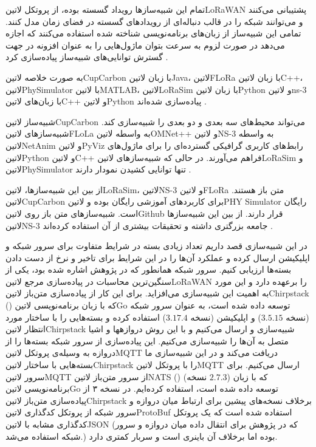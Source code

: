 تمام این شبیه‌سازها رویداد گسسته بوده، از پروتکل ‌لاتین{LoRaWAN} پشتیبانی می‌کنند و می‌توانند شبکه را در قالب
دنباله‌ای از رویدادهای گسسته در فضای زمان مدل کنند.
تمامی این شبیه‌ساز از زبان‌های برنامه‌نویسی شناخته شده استفاده می‌کنند که اجازه می‌دهد در صورت لزوم به سرعت بتوان
ماژول‌هایی را به عنوان افزونه در جهت گسترش توانایی‌های شبیه‌ساز پیاده‌سازی کرد
.

به صورت خلاصه ‌لاتین{CupCarbon} با زبان ‌لاتین{Java}، ‌لاتین{FLoRa} با زبان ‌لاتین{C++}،
‌لاتین{PhySimulator} با ‌لاتین{MATLAB}، ‌لاتین{LoRaSim} با زبان ‌لاتین{Python}
و ‌لاتین{ns-3} با زبان‌های ‌لاتین{C++} و ‌لاتین{Python} پیاده‌سازی شده‌اند
.

شبیه‌ساز ‌لاتین{CupCarbon} می‌تواند محیط‌های سه بعدی و دو بعدی را شبیه‌سازی کند.
شبیه‌سازهای ‌لاتین{FLoLa} به واسطه ‌لاتین{OMNet++} و ‌لاتین{NS-3} به واسطه
‌لاتین{NetAnim} و ‌لاتین{PyViz} رابط‌های کاربری گرافیکی گسترده‌ای را برای ماژول‌های ‌لاتین{Python}
و ‌لاتین{C++} فراهم می‌آورند.
در حالی که شبیه‌سازهای ‌لاتین{LoRaSim} و ‌لاتین{PhySimulator} تنها توانایی کشیدن نمودار دارند
.

از بین این شبیه‌سازها، ‌لاتین{LoRaSim}، ‌لاتین{NS-3} و ‌لاتین{FLoRa} متن باز هستند.
‌لاتین{CupCarbon} برای کاربردهای آموزشی رایگان بوده و ‌لاتین{PHY Simulator} رایگان است.
شبیه‌سازهای متن‌ باز روی ‌لاتین{Github} قرار دارند. از بین این شبیه‌سازها ‌لاتین{NS-3}
جامعه بزرگتری داشته و تحقیقات بیشتری از آن استفاده کرده‌اند
.


در این شبیه‌سازی قصد داریم تعداد زیادی بسته در شرایط متفاوت برای سرور شبکه و اپلیکیشن ارسال کرده و عملکرد آن‌ها را در این شرایط برای تاخیر و نرخ از دست دادن بسته‌ها ارزیابی کنیم.
سرور شبکه همانطور که در پژوهش  اشاره شده بود، یکی از سنگین‌ترین محاسبات در پیاده‌سازی مرجع ‌لاتین{LoRaWAN} را برعهده دارد و این مورد به
اهمیت این شبیه‌سازی می‌افزاید.
برای این کار از پیاده‌سازی متن‌باز ‌لاتین{Chirpstack} () که با زبان برنامه‌نویسی ‌لاتین{Go} توسعه داده شده است،
به عنوان سرور شبکه (نسخه $3.5.15$) و اپلیکیشن (نسخه $3.17.4$) استفاده کرده و بسته‌هایی را با ساختار مورد انتظار
‌لاتین{Chirpstack} شبیه‌سازی و ارسال می‌کنیم و با این روش دروازهها و اشیا متصل به آن‌ها را شبیه‌سازی می‌کنیم.
این پیاده‌سازی از سرور شبکه بسته‌ها را از دروازه به وسیله‌ی پروتکل ‌لاتین{MQTT} دریافت می‌کند و در این شبیه‌سازی ما بسته‌هایی با ساختار ‌لاتین{Chirpstack}
را با پروتکل ‌لاتین{MQTT} ارسال می‌کنیم. برای سرور ‌لاتین{MQTT} از سرور متن‌باز ‌لاتین{NATS} () (نسخه $2.7.3$)
که با زبان برنامه‌نویسی ‌لاتین{Go} توسعه داده شده است، استفاده کرده‌ایم.
در نسخه ۳ از پیاده‌سازی متن‌باز ‌لاتین{Chirpstack} برخلاف نسخه‌های پیشین برای ارتباط میان دروازه و سرور شبکه از پروتکل کدگذاری ‌لاتین{ProtoBuf} استفاده شده است که یک پروتکل
کدگذاری مشابه با ‌لاتین{JSON} (که در پژوهش  برای انتقال داده میان دروازه و سرور شبکه استفاده می‌شد.) بوده اما برخلاف آن باینری است و سربار کمتری دارد.

